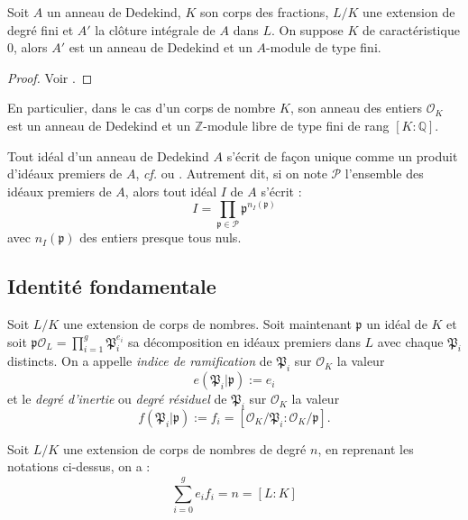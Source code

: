 \documentclass[a4paper]{article} %
\numberwithin{section}{part}
\numberwithin{equation}{section}
\newcommand\QQ{\mathbb{Q}}
\newcommand\ZZ{\mathbb{Z}}
\newcommand\EO{\mathcal{O}}
\begin{document}
\begin{thm}
Soit $A$ un anneau de Dedekind, $K$ son corps des fractions, $L/K$ une extension
de degré fini et $A'$ la clôture intégrale de $A$ dans $L$. On suppose $K$ de
caractéristique $0$, alors $A'$ est un anneau de Dedekind et un $A$-module de
type fini.
\end{thm}
\begin{proof}
Voir \cite[p.~59, th. 1]{Sam}.
\end{proof}
\begin{rem}
En particulier, dans le cas d'un corps de nombre $K$, son anneau des entiers
$\EO_K$ est un anneau de Dedekind et un $\ZZ$-module libre de type fini de rang
$[K:\QQ]$.
\end{rem}
Tout idéal d'un anneau de Dedekind $A$ s'écrit de façon unique comme un produit 
d'idéaux premiers de $A$, \emph{cf.} \cite[p.~60, th. 3]{Sam} ou 
\cite[§I.6, th. 2]{Lan2}. Autrement dit, si on note $\mathcal{P}$ l'ensemble des
idéaux premiers de $A$, alors tout idéal $I$ de $A$ s'écrit :
\begin{equation}
I = \prod_{\mathfrak{p}\in \mathcal{P}}{\mathfrak{p}^{n_I(\mathfrak{p})}}
\end{equation}
avec $n_I(\mathfrak{p})$ des entiers presque tous nuls.


\subsection{Identité fondamentale}
\begin{defn}
Soit $L/K$ une extension de corps de nombres. Soit maintenant $\mathfrak{p}$ un 
idéal de $K$ et soit $\mathfrak{p}\EO_L = \prod_{i=1}^{g}{\mathfrak{P}_i^{e_i}}$
sa décomposition en idéaux premiers dans $L$ avec chaque $\mathfrak{P}_i$
distincts. On a appelle \emph{indice de ramification} de $\mathfrak{P}_i$ sur 
$\EO_K$ la valeur 
\begin{equation}
e(\mathfrak{P}_i\vert \mathfrak{p}) := e_i
\end{equation}
et le \emph{degré d'inertie} ou \emph{degré résiduel} de $\mathfrak{P}_i$ sur
$\EO_K$ la valeur
\begin{equation}
f(\mathfrak{P}_i\vert \mathfrak{p}) := f_i =
[\EO_K/\mathfrak{P}_i:\EO_K/\mathfrak{p}].
\end{equation}
\end{defn}

\begin{thm}
\label{th:fundid}
Soit $L/K$ une extension de corps de nombres de degré $n$, en reprenant les 
notations ci-dessus, on a :
\begin{equation}
\sum_{i=0}^g{e_if_i} = n = [L:K]
\end{equation}
\end{thm}
\end{document}
